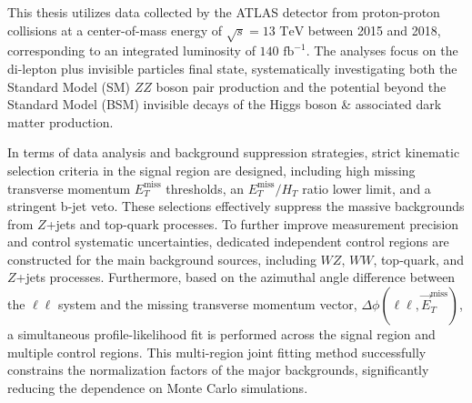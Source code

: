 
\begin{abstract*}

This thesis utilizes data collected by the ATLAS detector from proton-proton collisions at a center-of-mass energy of $\sqrt{s} = 13\text{ TeV}$ between 2015 and 2018, corresponding to an integrated luminosity of $140\text{ fb}^{-1}$. The analyses focus on the di-lepton plus invisible particles final state, systematically investigating both the Standard Model (SM) $ZZ$ boson pair production and the potential beyond the Standard Model (BSM) invisible decays of the Higgs boson \& associated dark matter production.

In terms of data analysis and background suppression strategies, strict kinematic selection criteria in the signal region are designed, including high missing transverse momentum $E_{T}^{\text{miss}}$ thresholds, an $E_{T}^{\text{miss}}/H_{T}$ ratio lower limit, and a stringent b-jet veto. These selections effectively suppress the massive backgrounds from $Z$+jets and top-quark processes. To further improve measurement precision and control systematic uncertainties, dedicated independent control regions are constructed for the main background sources, including $WZ$, $WW$, top-quark, and $Z$+jets processes. Furthermore, based on the azimuthal angle difference between the $\ell\ell$ system and the missing transverse momentum vector, $\Delta\phi(\ell\ell, \vec{E}_{T}^{\text{miss}})$, a simultaneous profile-likelihood fit is performed across the signal region and multiple control regions. This multi-region joint fitting method successfully constrains the normalization factors of the major backgrounds, significantly reducing the dependence on Monte Carlo simulations.


\end{abstract*}
